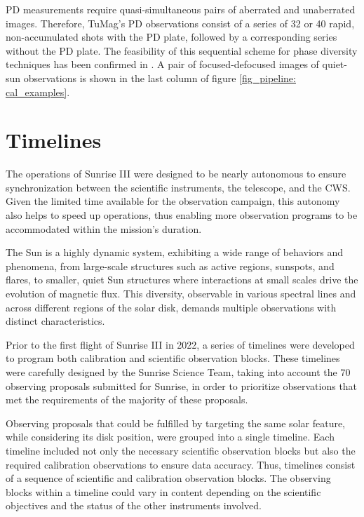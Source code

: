 PD measurements require quasi-simultaneous pairs of aberrated and unaberrated images. Therefore, TuMag's PD observations consist of a series of 32 or 40 rapid, non-accumulated shots with the PD plate, followed by a corresponding series without the PD plate. The feasibility of this sequential scheme for phase diversity techniques has been confirmed in \cite{PD_sequential}. A pair of focused-defocused images of quiet-sun observations is shown in the last column of figure \ref{fig_pipeline: cal_examples}.   

\section{Timelines}

The operations of Sunrise III were designed to be nearly autonomous to ensure synchronization between the scientific instruments, the telescope, and the CWS. Given the limited time available for the observation campaign, this autonomy also helps to speed up operations, thus enabling more observation programs to be accommodated within the mission's duration.

The Sun is a highly dynamic system, exhibiting a wide range of behaviors and phenomena, from large-scale structures such as active regions, sunspots, and flares, to smaller, quiet Sun structures where interactions at small scales drive the evolution of magnetic flux. This diversity, observable in various spectral lines and across different regions of the solar disk, demands multiple observations with distinct characteristics.

Prior to the first flight of Sunrise III in 2022, a series of timelines were developed to program both calibration and scientific observation blocks. These timelines were carefully designed by the Sunrise Science Team, taking into account the 70 observing proposals submitted for Sunrise, in order to prioritize observations that met the requirements of the majority of these proposals.

Observing proposals that could be fulfilled by targeting the same solar feature, while considering its disk position, were grouped into a single timeline. Each timeline included not only the necessary scientific observation blocks but also the required calibration observations to ensure data accuracy. Thus, timelines consist of a sequence of scientific and calibration observation blocks. The observing blocks within a timeline could vary in content depending on the scientific objectives and the status of the other instruments involved.

